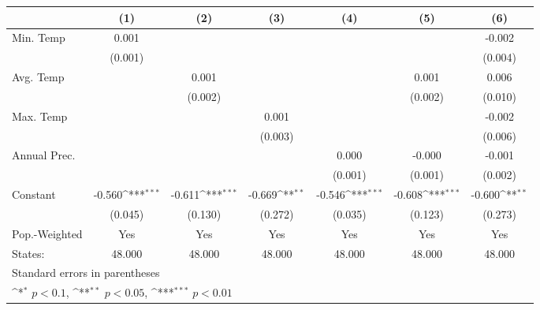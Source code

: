 {
\def\sym#1{\ifmmode^{#1}\else\(^{#1}\)\fi}
\begin{tabular}{l*{6}{c}}
\hline\hline
            &\multicolumn{1}{c}{(1)}         &\multicolumn{1}{c}{(2)}         &\multicolumn{1}{c}{(3)}         &\multicolumn{1}{c}{(4)}         &\multicolumn{1}{c}{(5)}         &\multicolumn{1}{c}{(6)}         \\
\hline
Min. Temp   &       0.001         &                     &                     &                     &                     &      -0.002         \\
            &     (0.001)         &                     &                     &                     &                     &     (0.004)         \\
[1em]
Avg. Temp   &                     &       0.001         &                     &                     &       0.001         &       0.006         \\
            &                     &     (0.002)         &                     &                     &     (0.002)         &     (0.010)         \\
[1em]
Max. Temp   &                     &                     &       0.001         &                     &                     &      -0.002         \\
            &                     &                     &     (0.003)         &                     &                     &     (0.006)         \\
[1em]
Annual Prec.&                     &                     &                     &       0.000         &      -0.000         &      -0.001         \\
            &                     &                     &                     &     (0.001)         &     (0.001)         &     (0.002)         \\
[1em]
Constant    &      -0.560\sym{***}&      -0.611\sym{***}&      -0.669\sym{**} &      -0.546\sym{***}&      -0.608\sym{***}&      -0.600\sym{**} \\
            &     (0.045)         &     (0.130)         &     (0.272)         &     (0.035)         &     (0.123)         &     (0.273)         \\
\hline
Pop.-Weighted&         Yes         &         Yes         &         Yes         &         Yes         &         Yes         &         Yes         \\
States:     &      48.000         &      48.000         &      48.000         &      48.000         &      48.000         &      48.000         \\
\hline\hline
\multicolumn{7}{l}{\footnotesize Standard errors in parentheses}\\
\multicolumn{7}{l}{\footnotesize \sym{*} \(p<0.1\), \sym{**} \(p<0.05\), \sym{***} \(p<0.01\)}\\
\end{tabular}
}
